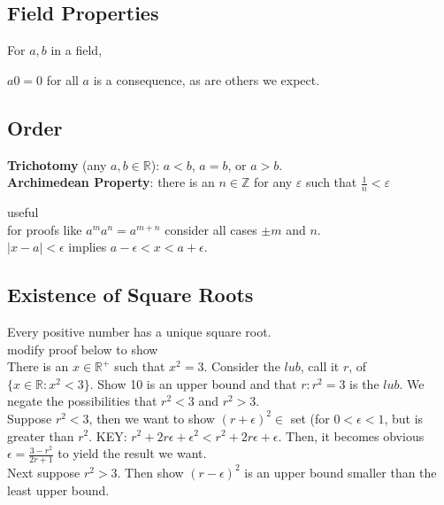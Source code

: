 \documentclass[12pt]{article}
\begin{document}
\subsection*{Field Properties}


For $a, b$ in a field, \\
\begin{center}
\end{center}
\medskip

$a0 = 0$ for all $a$ is a consequence, as are others we expect.\\

\subsection*{Order}
\textbf{Trichotomy} (any $a, b \in \mathbb{R}$): $a<b$, $a=b$, or $a>b$.\\ 




\noindent \textbf{Archimedean Property}: there is an $n \in \mathbb{Z}$ for any $\varepsilon$ such that $\frac{1}{n} < \varepsilon$

useful\\
for proofs like $a^ma^n= a^{m+n}$ consider all cases $\pm m$ and $n$.\\
$|x-a| < \epsilon$ implies $a - \epsilon < x < a + \epsilon$.\\
\subsection*{Existence of Square Roots}
Every positive number has a unique square root. \\
\textcolor[gray]{0.5}{modify proof below to show}\\

There is an $x \in \mathbb{R}^+$ such that $x^2 = 3$.
\textcolor[gray]{0.5}{
Consider the $lub$, call it $r$, of $\{ x \in \mathbb{R} : x^2 < 3\}$. Show 10 is an upper bound and that $r : r^2=3$ is the $lub$. We negate the possibilities that $r^2 < 3$ and $r^2 > 3$.\\
Suppose $r^2<3$, then we want to show $(r+\epsilon)^2 \in$ set (for $0<\epsilon<1$, but is greater than $r^2$. KEY: $r^2 + 2r\epsilon + \epsilon ^2 < r^2 + 2r\epsilon + \epsilon$. Then, it becomes obvious $\epsilon = \frac{3-r^2}{2r+1}$ to yield the result we want. \\
Next suppose $r^2>3$. Then show $(r-\epsilon)^2$ is an upper bound smaller than the least upper bound.
}
\end{document}
